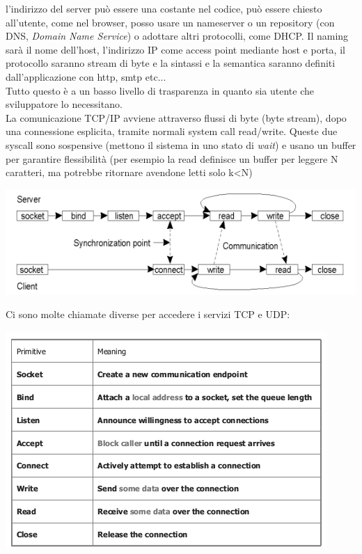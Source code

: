 \documentclass[a4paper,12pt, oneside]{book}
\begin{document}
l'indirizzo del server può essere una costante nel codice, può essere chiesto all'utente, come nel browser, posso usare un nameserver o un repository (con DNS, \textit{Domain Name Service}) o adottare altri protocolli, come DHCP. Il naming sarà il nome dell'host, l'indirizzo IP come access point mediante host e porta, il protocollo saranno stream di byte e la sintassi e la semantica saranno definiti dall'applicazione con http, smtp etc...\\
Tutto questo è a un basso livello di trasparenza in quanto sia utente che sviluppatore lo necessitano.\\
La comunicazione TCP/IP avviene attraverso flussi di byte
(byte stream), dopo una connessione esplicita, tramite
normali system call read/write. Queste due syscall sono sospensive (mettono il sistema in uno stato di \textit{wait}) e usano un buffer per garantire flessibilità (per esempio la read definisce un buffer per leggere N caratteri, ma potrebbe ritornare avendone letti solo k<N)
\begin{center}
\includegraphics[scale=0.7]{img/sc2.png}
\end{center}
\newpage
Ci sono molte chiamate diverse per accedere i servizi TCP e UDP:
\begin{center}
\includegraphics[scale=3]{img/sc3.png}
\end{center}
\end{document}
